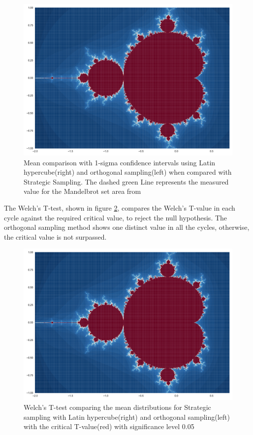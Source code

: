 \documentclass{uva-inf-article}
\begin{document}
\begin{figure}[h!]
  \centering
 \includegraphics[width=.85\textwidth]{graphs/fractal.pdf}
  \caption{Mean comparison with 1-sigma confidence intervals using Latin hypercube(right) and orthogonal sampling(left) when compared with Strategic Sampling. The dashed green Line represents the measured value for the Mandelbrot set area from \parencite{mitchell2001}}
  \label{fig:c_mean}
\end{figure}
  

The Welch's T-test, shown in figure \ref{fig:welch_t}, compares the Welch's T-value in each cycle against the required critical value, to reject the null hypothesis. The orthogonal sampling method shows one distinct value in all the cycles, otherwise, the critical value is not surpassed.\\
\begin{figure}[h!]
  \centering
  \includegraphics[width=.85\textwidth]{graphs/fractal.pdf}
  \caption{Welch's T-test comparing the mean distributions for Strategic sampling with Latin hypercube(right) and orthogonal sampling(left) with the critical T-value(red) with significance level 0.05}
  \label{fig:welch_t}
\end{figure}
\end{document}
